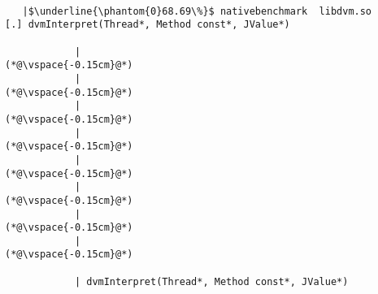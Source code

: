 
\begin{lstlisting}[caption=20 viiteparametria Java$\to$C , label=profile:J2CBenchmark00206, numberbychapter=true, frame=lines, float, floatplacement=t]

   |$\underline{\phantom{0}68.69\%}$ nativebenchmark  libdvm.so           [.] dvmInterpret(Thread*, Method const*, JValue*)

            |
(*@\vspace{-0.15cm}@*)
            |
(*@\vspace{-0.15cm}@*)
            |
(*@\vspace{-0.15cm}@*)
            |
(*@\vspace{-0.15cm}@*)
            |
(*@\vspace{-0.15cm}@*)
            |
(*@\vspace{-0.15cm}@*)
            |
(*@\vspace{-0.15cm}@*)
            |
(*@\vspace{-0.15cm}@*)
 
            | dvmInterpret(Thread*, Method const*, JValue*)


\end{lstlisting}
